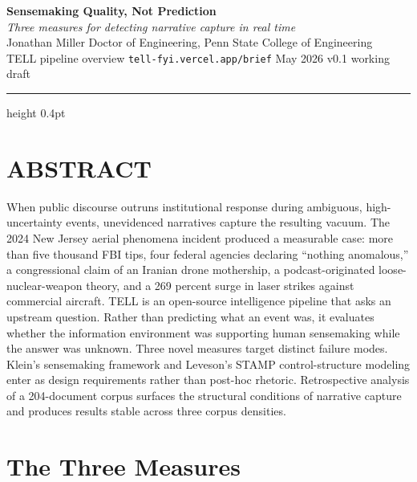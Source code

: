 \documentclass[10pt, letterpaper]{article}
\begin{document}
\begingroup
\centering
{\Large\bfseries Sensemaking Quality, Not Prediction}\\[3pt]
{\normalsize\itshape Three measures for detecting narrative capture in real time}\\[6pt]
{\small Jonathan Miller \;\textbullet\; Doctor of Engineering, Penn State College of Engineering}\\
{\footnotesize\color{muted} TELL pipeline overview \;\textbullet\; \texttt{tell-fyi.vercel.app/brief} \;\textbullet\; May 2026 \;\textbullet\; v0.1 working draft}
\par
\endgroup

\vspace{6pt}
{\color{muted}\hrule height 0.4pt}
\vspace{6pt}

\section*{\color{accent}\MakeUppercase{Abstract}}
\vspace{-4pt}

When public discourse outruns institutional response during ambiguous, high-uncertainty events, unevidenced narratives capture the resulting vacuum.
The 2024 New Jersey aerial phenomena incident produced a measurable case: more than five thousand FBI tips, four federal agencies declaring ``nothing anomalous,'' a congressional claim of an Iranian drone mothership, a podcast-originated loose-nuclear-weapon theory, and a 269 percent surge in laser strikes against commercial aircraft.
TELL is an open-source intelligence pipeline that asks an upstream question.
Rather than predicting what an event was, it evaluates whether the information environment was supporting human sensemaking while the answer was unknown.
Three novel measures target distinct failure modes.
Klein's sensemaking framework and Leveson's STAMP control-structure modeling enter as design requirements rather than post-hoc rhetoric.
Retrospective analysis of a 204-document corpus surfaces the structural conditions of narrative capture and produces results stable across three corpus densities.

\section{The Three Measures}
\end{document}
